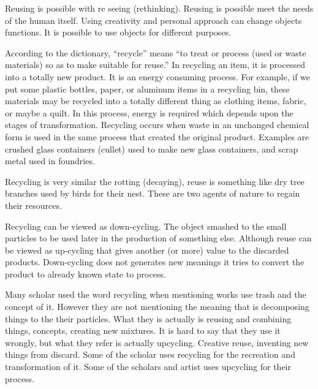  Reusing is possible with re seeing (rethinking). Reusing is possible meet the needs of the human itself. Using creativity and personal approach can change objects functions. It is possible to use objects for different purposes. 


According to the dictionary, “recycle” means “to treat or process (used or waste materials) so as to make suitable for reuse.” In recycling an item, it is processed into a totally new product. It is an energy consuming process. For example, if we put some plastic bottles, paper, or aluminum items in a recycling bin, these materials may be recycled into a totally different thing as clothing items, fabric, or maybe a quilt. In this process, energy is required which depends upon the stages of transformation. Recycling occurs when waste in an unchanged chemical form is used in the same process that created the original product. Examples are crushed glass containers (cullet) used to make new glass containers, and scrap metal used in foundries. 

Recycling is very similar the rotting (decaying), reuse is something like dry tree branches used by birds for their nest. These are two agents of nature to regain their resources.

Recycling can be viewed as down-cycling. The object smashed to the small particles to be used later in the production of something else. Although reuse can be viewed as up-cycling that gives another (or more) value to the discarded products. Down-cycling does not generates new meanings it tries to convert the product to already known state to process. 

Many scholar used the word recycling when mentioning works use trash and the concept of it. However they are not mentioning the meaning that is decomposing things to the their particles. What they is actually is reusing and combining things, concepts, creating new mixtures. It is hard to say that they use it wrongly, but what they refer is actually upcycling. Creative reuse, inventing new things from discard. Some of the scholar uses recycling \cite{cerny1996recycled,herman1998trashformations} for the recreation and transformation of it. Some of the scholars and artist uses upcycling for their process.


